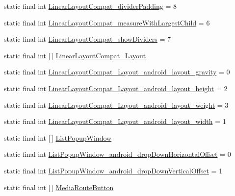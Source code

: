 \begin{DoxyCompactItemize}
\item 
static final int \hyperlink{classproject4_1_1xaria_1_1R_1_1styleable_aabd76c769aacad577cc5b52c4a9cffb6}{Linear\+Layout\+Compat\+\_\+divider\+Padding} = 8
\item 
static final int \hyperlink{classproject4_1_1xaria_1_1R_1_1styleable_a83b43869079dce397a9b632d885316f2}{Linear\+Layout\+Compat\+\_\+measure\+With\+Largest\+Child} = 6
\item 
static final int \hyperlink{classproject4_1_1xaria_1_1R_1_1styleable_aa54ceb6abf29ba55186f4ef137e636d8}{Linear\+Layout\+Compat\+\_\+show\+Dividers} = 7
\item 
static final int \mbox{[}$\,$\mbox{]} \hyperlink{classproject4_1_1xaria_1_1R_1_1styleable_abae4849d55752ff5e7c774316d11a406}{Linear\+Layout\+Compat\+\_\+\+Layout}
\item 
static final int \hyperlink{classproject4_1_1xaria_1_1R_1_1styleable_a3d4210a3c6954cfd1b37a9986adcce9a}{Linear\+Layout\+Compat\+\_\+\+Layout\+\_\+android\+\_\+layout\+\_\+gravity} = 0
\item 
static final int \hyperlink{classproject4_1_1xaria_1_1R_1_1styleable_a514bc318a57eacc2db4dabf146f619d7}{Linear\+Layout\+Compat\+\_\+\+Layout\+\_\+android\+\_\+layout\+\_\+height} = 2
\item 
static final int \hyperlink{classproject4_1_1xaria_1_1R_1_1styleable_af9b6891271285deca2960de74d2f02e6}{Linear\+Layout\+Compat\+\_\+\+Layout\+\_\+android\+\_\+layout\+\_\+weight} = 3
\item 
static final int \hyperlink{classproject4_1_1xaria_1_1R_1_1styleable_a4640277fdb6931622906c6d4df4ca733}{Linear\+Layout\+Compat\+\_\+\+Layout\+\_\+android\+\_\+layout\+\_\+width} = 1
\item 
static final int \mbox{[}$\,$\mbox{]} \hyperlink{classproject4_1_1xaria_1_1R_1_1styleable_a648f834c188005b618d26a2407391de2}{List\+Popup\+Window}
\item 
static final int \hyperlink{classproject4_1_1xaria_1_1R_1_1styleable_a8004d07b04c30d96817792efd7c20247}{List\+Popup\+Window\+\_\+android\+\_\+drop\+Down\+Horizontal\+Offset} = 0
\item 
static final int \hyperlink{classproject4_1_1xaria_1_1R_1_1styleable_a4d028c17c849372c3e3ced8a7e62a8ce}{List\+Popup\+Window\+\_\+android\+\_\+drop\+Down\+Vertical\+Offset} = 1
\item 
static final int \mbox{[}$\,$\mbox{]} \hyperlink{classproject4_1_1xaria_1_1R_1_1styleable_afbc7b05aea080f3e7e5fb4051290a14d}{Media\+Route\+Button}
\item 

\end{DoxyCompactItemize}

